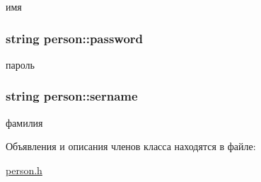 имя 

\hypertarget{classperson_a1446508205052d36612df33f40272210}{
\subsubsection[{password}]{\setlength{\rightskip}{0pt plus 5cm}string person\-::password\hspace{0.3cm}{\ttfamily [protected]}}}\label{classperson_a1446508205052d36612df33f40272210}


пароль 

\hypertarget{classperson_a8b678a1da57e030abe924a22882f6aaf}{
\subsubsection[{sername}]{\setlength{\rightskip}{0pt plus 5cm}string person\-::sername\hspace{0.3cm}{\ttfamily [protected]}}}\label{classperson_a8b678a1da57e030abe924a22882f6aaf}


фамилия 



Объявления и описания членов класса находятся в файле\-:\begin{DoxyCompactItemize}
\item 
\hyperlink{person_8h}{person.\-h}\end{DoxyCompactItemize}
